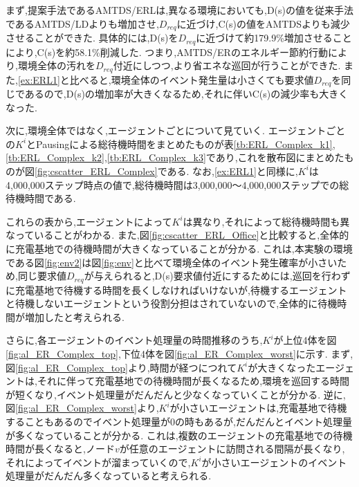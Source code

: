 \documentclass[12pt,a4j,twoside]{jarticle}
\begin{document}
  \par
  まず,提案手法であるAMTDS/ERLは,異なる環境においても,D(s)の値を従来手法であるAMTDS/LDよりも増加させ,$D_{req}$に近づけ,C(s)の値をAMTDSよりも減少させることができた.
  具体的には,D(s)を$D_{req}$に近づけて約179.9\%増加させることにより,C(s)を約58.1\%削減した.
  つまり,AMTDS/ERのエネルギー節約行動により,環境全体の汚れを$D_{req}$付近にしつつ,より省エネな巡回が行うことができた.
  また,\ref{ex:ERL1}と比べると,環境全体のイベント発生量は小さくても要求値$D_{req}$を同じであるので,D(s)の増加率が大きくなるため,それに伴いC(s)の減少率も大きくなった.
  
  \par
  次に,環境全体ではなく,エージェントごとについて見ていく.
  エージェントごとの$K^i$とPausingによる総待機時間をまとめたものが表\ref{tb:ERL_Complex_k1},\ref{tb:ERL_Complex_k2},\ref{tb:ERL_Complex_k3}であり,これを散布図にまとめたものが図\ref{fig:cscatter_ERL_Complex}である.
  なお,\ref{ex:ERL1}と同様に,$K^i$は4,000,000ステップ時点の値で,総待機時間は3,000,000～4,000,000ステップでの総待機時間である.
  
  これらの表から,エージェントによって$K^i$は異なり,それによって総待機時間も異なっていることがわかる.
  また,図\ref{fig:cscatter_ERL_Office}と比較すると,全体的に充電基地での待機時間が大きくなっていることが分かる.
  これは,本実験の環境である図\ref{fig:env2}は図\ref{fig:env}と比べて環境全体のイベント発生確率が小さいため,同じ要求値$D_{req}$が与えられると,D(s)要求値付近にするためには,巡回を行わずに充電基地で待機する時間を長くしなければいけないが,待機するエージェントと待機しないエージェントという役割分担はされていないので,全体的に待機時間が増加したと考えられる.
  
  \par
  さらに,各エージェントのイベント処理量の時間推移のうち,$K^i$が上位4体を図\ref{fig:al_ER_Complex_top},下位4体を図\ref{fig:al_ER_Complex_worst}に示す.
  まず,図\ref{fig:al_ER_Complex_top}より,時間が経つにつれて$K^i$が大きくなったエージェントは,それに伴って充電基地での待機時間が長くなるため,環境を巡回する時間が短くなり,イベント処理量がだんだんと少なくなっていくことが分かる.
  逆に,図\ref{fig:al_ER_Complex_worst}より,$K^i$が小さいエージェントは,充電基地で待機することもあるのでイベント処理量が0の時もあるが,だんだんとイベント処理量が多くなっていることが分かる.
  これは,複数のエージェントの充電基地での待機時間が長くなると,ノード$v$が任意のエージェントに訪問される間隔が長くなり,それによってイベントが溜まっていくので,$K^i$が小さいエージェントのイベント処理量がだんだん多くなっていると考えられる.
\end{document}
